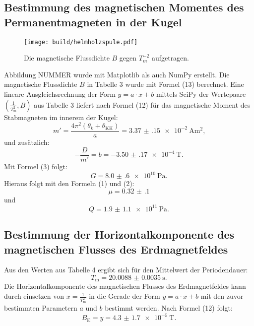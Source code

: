 \subsection{Bestimmung des magnetischen Momentes des Permanentmagneten in der Kugel}
\begin{figure}[H]
	\centering
	\caption{Die magnetische Flussdichte $B$ gegen $T_m ^{-2}$ aufgetragen.}
	\texttt{[image: build/helmholzspule.pdf]}
	\label{fig:grad3}
\end{figure}

Abbildung NUMMER wurde mit Matplotlib \cite{matplotlib} als auch NumPy \cite{numpy} erstellt.
Die magnetische Flussdichte $B$ in Tabelle 3 wurde mit Formel (13) berechnet.
Eine lineare Ausgleichsrechnung der Form $y = a \cdot x + b$ mittels SciPy \cite{scipy} der Wertepaare $\left(\frac{1}{T_\text{m}^2}, B\right)$ aus Tabelle 3 liefert nach Formel (12) für das magnetische Moment des Stabmagneten im innerem der Kugel:
\begin{displaymath}
	m' = \frac{4 \pi ^2 (\theta_k + \theta_{\text{KH}})}{a} = \SI{3.37(15)e-2}{\ampere\meter\squared}\text{,}
\end{displaymath}
und zusätzlich:
\begin{displaymath} 
	-\frac{D}{m'} = b =  \SI{-3.50(17)e-4}{\tesla}\text{.}
\end{displaymath}
Mit Formel (3) folgt:
\begin{displaymath} 
	G =  \SI{8.0(6)e10}{\pascal}\text{.}
\end{displaymath}
Hieraus folgt mit den Formeln (1) und (2):
\begin{displaymath}
	\mu = \num{0.32(10)}
\end{displaymath}
und
\begin{displaymath} 
	Q =  \SI{1.9(11)e11}{\pascal}\text{.}
\end{displaymath}






\subsection{Bestimmung der Horizontalkomponente des magnetischen Flusses des Erdmagnetfeldes}

Aus den Werten aus Tabelle 4 ergibt sich für den Mittelwert der Periodendauer:
\begin{displaymath}
	T_\text{m} = \SI{20.0088(35)}{\second}\text{.}
\end{displaymath}
Die Horizontalkomponente des magnetischen Flusses des Erdmagnetfeldes kann durch einsetzen von $x=\frac{1}{T_\text{m}^2}$ in die Gerade der Form $y = a \cdot x +b$ mit den zuvor bestimmten Parametern $a$ und $b$ bestimmt werden. Nach Formel (12) folgt:
\begin{displaymath}
	B_\text{E} = y = \SI{ 4.3(17)e-5}{\tesla}\text{.}
\end{displaymath}


